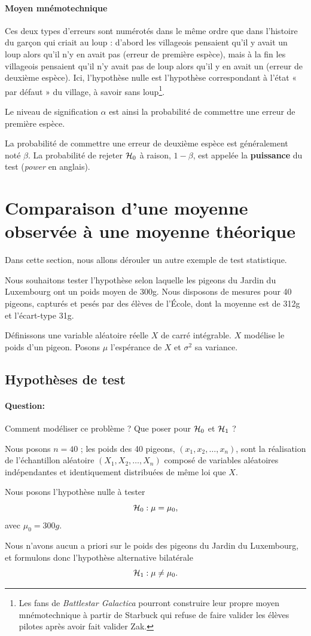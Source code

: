 \paragraph{Moyen mnémotechnique} Ces deux types d'erreurs sont numérotés dans
le même ordre que dans l'histoire du garçon qui criait au loup : d'abord les
villageois pensaient qu'il y avait un loup alors qu'il n'y en avait pas (erreur
de première espèce), mais à la fin les villageois pensaient qu'il n'y avait pas
de loup alors qu'il y en avait un (erreur de deuxième espèce). Ici, l'hypothèse
nulle est l'hypothèse correspondant à l'état « par défaut » du village, à
savoir sans loup\footnote{Les fans de \textit{Battlestar Galactica} pourront
construire leur propre moyen mnémotechnique à partir de Starbuck qui refuse
de faire valider les élèves pilotes après avoir fait valider Zak.}.

Le niveau de signification $\alpha$ est ainsi la probabilité de commettre une
erreur de première espèce.

La probabilité de commettre une erreur de deuxième espèce est généralement noté
$\beta$. La probabilité de rejeter $\mathcal{H}_0$ à raison, $1-\beta$, est appelée la
\textbf{puissance} du test (\textit{power} en anglais).


\section{Comparaison d'une moyenne observée à une moyenne théorique}
\label{sec:test_moyenne}
Dans cette section, nous allons dérouler un autre exemple de test statistique. 

Nous souhaitons tester l'hypothèse selon laquelle les pigeons du Jardin du
Luxembourg ont un poids moyen de 300g. Nous disposons de mesures pour 40
pigeons, capturés et pesés par des élèves de l'École, dont la moyenne est de
312g et l'écart-type 31g.

Définissons une variable aléatoire réelle $X$ de carré intégrable. $X$ modélise
le poids d'un pigeon. Posons $\mu$ l'espérance de $X$ et $\sigma^2$ sa
variance.

\subsection{Hypothèses de test}
\paragraph{Question:} Comment modéliser ce problème ? Que poser pour $\mathcal{H}_0$ et
$\mathcal{H}_1$ ? \newpage
\begin{answer}
  Nous posons $n=40$ ; les poids des 40 pigeons, $(x_1, x_2, \dots, x_n)$, sont
  la réalisation de l'échantillon aléatoire $(X_1, X_2, \dots, X_n)$ composé de
  variables aléatoires indépendantes et identiquement distribuées de même loi
  que $X$.

  Nous posons l'hypothèse nulle à tester
  \[
    \mathcal{H}_0 : \mu = \mu_0,
  \]
  avec $\mu_0 = 300\si{g}.$

  Nous n'avons aucun a priori sur le poids des pigeons du Jardin du Luxembourg,
  et formulons donc l'hypothèse alternative bilatérale
  \[
    \mathcal{H}_1 : \mu \neq \mu_0.
  \]
\end{answer}

